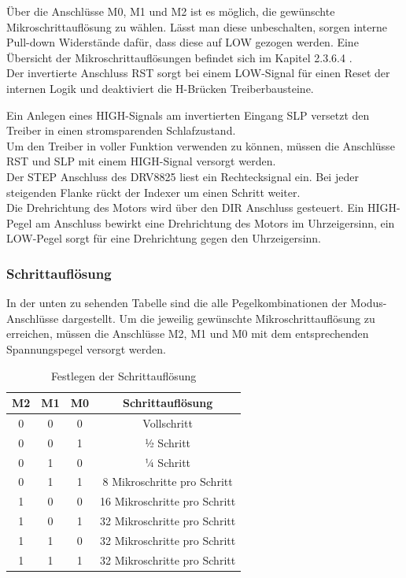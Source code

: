 Über die Anschlüsse M0, M1 und M2 ist es möglich, die gewünschte Mikroschrittauflösung zu wählen.
Lässt man diese unbeschalten, sorgen interne Pull-down Widerstände dafür, dass diese auf LOW gezogen werden.
Eine Übersicht der Mikroschrittauflösungen befindet sich im Kapitel 2.3.6.4 . \\

Der invertierte Anschluss RST sorgt bei einem LOW-Signal für einen Reset der internen Logik und deaktiviert die H-Brücken Treiberbausteine. \\

\newpage

Ein Anlegen eines HIGH-Signals am invertierten Eingang SLP versetzt den Treiber in einen stromsparenden Schlafzustand. \\

Um den Treiber in voller Funktion verwenden zu können, müssen die Anschlüsse RST und SLP mit einem HIGH-Signal versorgt werden. \\

Der STEP Anschluss des DRV8825 liest ein Rechtecksignal ein.
Bei jeder steigenden Flanke rückt der Indexer um einen Schritt weiter. \\

Die Drehrichtung des Motors wird über den DIR Anschluss gesteuert.
Ein HIGH-Pegel am Anschluss bewirkt eine Drehrichtung des Motors im Uhrzeigersinn, ein LOW-Pegel sorgt für eine Drehrichtung gegen den Uhrzeigersinn.

\subsubsection{Schrittauflösung}
In der unten zu sehenden Tabelle sind die alle Pegelkombinationen der Modus-Anschlüsse dargestellt.
Um die jeweilig gewünschte Mikroschrittauflösung zu erreichen, müssen die Anschlüsse M2, M1 und M0 mit dem entsprechenden Spannungspegel versorgt werden.

\begin{table}[h]
    \centering
    \begin{tabular}{|c|c|c|c|}
        \hline
        \textbf{M2} & \textbf{M1} & \textbf{M0} & \textbf{Schrittauflösung}    \\ \hline
        0 & 0 & 0 & Vollschritt                  \\ \hline
        0 & 0 & 1 & ½ Schritt                    \\ \hline
        0 & 1 & 0 & ¼ Schritt                    \\ \hline
        0 & 1 & 1 & 8 Mikroschritte pro Schritt  \\ \hline
        1 & 0 & 0 & 16 Mikroschritte pro Schritt \\ \hline
        1 & 0 & 1 & 32 Mikroschritte pro Schritt \\ \hline
        1 & 1 & 0 & 32 Mikroschritte pro Schritt \\ \hline
        1 & 1 & 1 & 32 Mikroschritte pro Schritt \\ \hline
    \end{tabular}
    \caption{Festlegen der Schrittauflösung}
\end{table}

